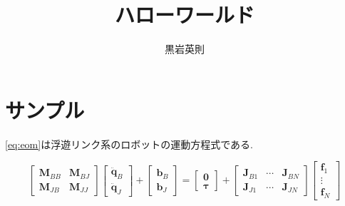 \documentclass[a4paper, onecolumn, 10pt, uplatex, dvipdfmx]{jsarticle}
\title{ハローワールド}
\author{黒岩英則}
\date{\Filemodtoday{\jobname}}
\begin{document}
\maketitle

\section{サンプル}
\autoref{eq:eom}は浮遊リンク系のロボットの運動方程式である.

\begin{equation}
  \begin{bmatrix}
    \bm{M}_{BB} & \bm{M}_{BJ}\\
    \bm{M}_{JB} & \bm{M}_{JJ}
  \end{bmatrix}
  \begin{bmatrix}
    \ddot{\bm{q}}_{B}\\
    \ddot{\bm{q}}_{J}
  \end{bmatrix}
  +
  \begin{bmatrix}
    \bm{b}_{B}\\
    \bm{b}_{J}
  \end{bmatrix}
  =
  \begin{bmatrix}
    \bm{0}\\
    \bm{\tau}
  \end{bmatrix}
  +
  \begin{bmatrix}
    \bm{J}_{B1} & \cdots & \bm{J}_{BN}\\
    \bm{J}_{J1} & \cdots & \bm{J}_{JN}
  \end{bmatrix}
  \begin{bmatrix}
    \bm{f}_1\\
    \vdots\\
    \bm{f}_N
  \end{bmatrix}
  \label{eq:eom}
\end{equation}
\end{document}
